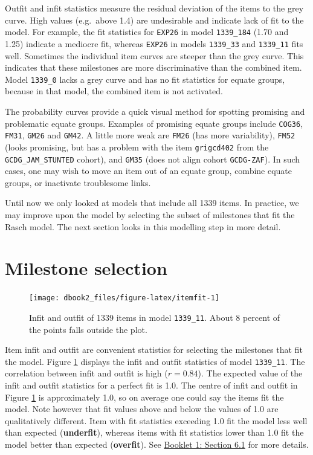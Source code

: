 \documentclass[
]{book}
\begin{document}
Outfit and infit statistics measure the residual deviation of the items to the grey curve. High values (e.g.~above 1.4) are undesirable and indicate lack of fit to the model. For example, the fit statistics for \texttt{EXP26} in model \texttt{1339\_184} (1.70 and 1.25) indicate a mediocre fit, whereas \texttt{EXP26} in models \texttt{1339\_33} and \texttt{1339\_11} fits well. Sometimes the individual item curves are steeper than the grey curve. This indicates that these milestones are more discriminative than the combined item. Model \texttt{1339\_0} lacks a grey curve and has no fit statistics for equate groups, because in that model, the combined item is not activated.

The probability curves provide a quick visual method for spotting promising and problematic equate groups. Examples of promising equate groups include \texttt{COG36}, \texttt{FM31}, \texttt{GM26} and \texttt{GM42}. A little more weak are \texttt{FM26} (has more variability), \texttt{FM52} (looks promising, but has a problem with the item \texttt{grigcd402} from the \texttt{GCDG\_JAM\_STUNTED} cohort), and \texttt{GM35} (does not align cohort \texttt{GCDG-ZAF}). In such cases, one may wish to move an item out of an equate group, combine equate groups, or inactivate troublesome links.

Until now we only looked at models that include all 1339 items. In practice, we may improve upon the model by selecting the subset of milestones that fit the Rasch model. The next section looks in this modelling step in more detail.

\hypertarget{sec:milestoneselection}{%
\section{Milestone selection}\label{sec:milestoneselection}}

\begin{figure}

{\centering \texttt{[image: dbook2\_files/figure-latex/itemfit-1]} 

}

\caption{Infit and outfit of 1339 items in model \texttt{1339\_11}. About 8 percent of the points falls outside the plot.}\label{fig:itemfit}
\end{figure}



Item infit and outfit are convenient statistics for selecting the milestones that fit the model. Figure \ref{fig:itemfit} displays the infit and outfit statistics of model \texttt{1339\_11}. The correlation between infit and outfit is high (\(r = 0.84\)). The expected value of the infit and outfit statistics for a perfect fit is 1.0. The centre of infit and outfit in Figure \ref{fig:itemfit} is approximately 1.0, so on average one could say the items fit the model. Note however that fit values above and below the values of 1.0 are qualitatively different. Item with fit statistics exceeding 1.0 fit the model less well than expected (\textbf{underfit}), whereas items with fit statistics lower than 1.0 fit the model better than expected (\textbf{overfit}). See \href{https://d-score.org/dbook1/sec-itemfit.html}{Booklet 1: Section 6.1} for more details.
\end{document}
